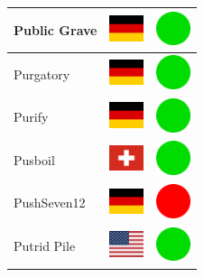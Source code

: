 \documentclass[12pt, a4paper, twoside]{report}
\begin{document}
\begin{center}
\begin{longtable}{|p{5cm}|p{2cm}|p{2cm}|}
 Public Grave                                               & \includegraphics[width=1cm]{4x3/de} &   \includegraphics[width=1cm]{likes/y} \\ \hline
 Purgatory                                                  & \includegraphics[width=1cm]{4x3/de} &   \includegraphics[width=1cm]{likes/y} \\ \hline
 Purify                                                     & \includegraphics[width=1cm]{4x3/de} &   \includegraphics[width=1cm]{likes/y} \\ \hline
 Pusboil                                                    & \includegraphics[width=1cm]{4x3/ch} &   \includegraphics[width=1cm]{likes/y} \\ \hline
 PushSeven12                                                & \includegraphics[width=1cm]{4x3/de} &   \includegraphics[width=1cm]{likes/n} \\ \hline
 Putrid Pile                                                & \includegraphics[width=1cm]{4x3/us} &   \includegraphics[width=1cm]{likes/y} \\ \hline

\end{longtable}
\end{center}
\end{document}
